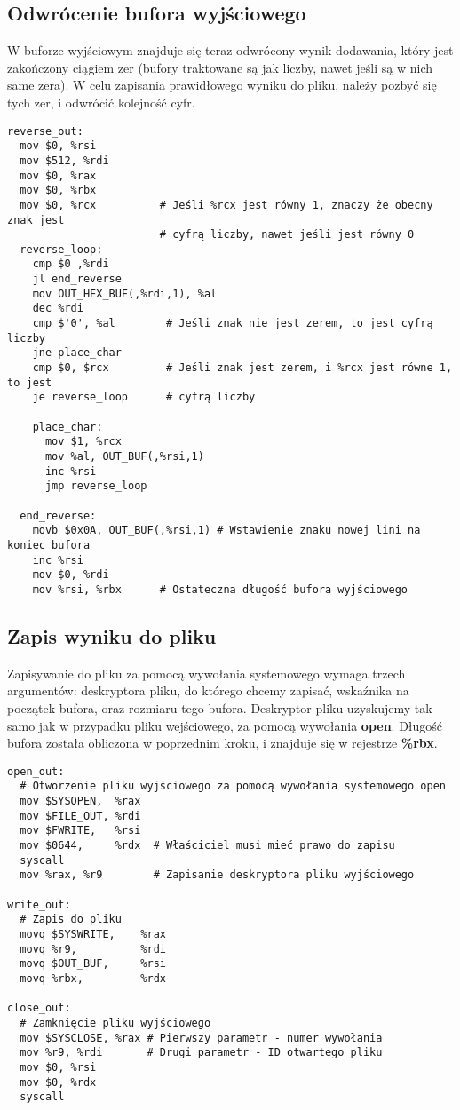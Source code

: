 \documentclass[11pt]{report}
\begin{document}
\subsection{Odwrócenie bufora wyjściowego}
W buforze wyjściowym znajduje się teraz odwrócony wynik dodawania, który jest zakończony ciągiem zer (bufory traktowane są jak liczby, nawet jeśli są w nich same zera). W celu zapisania prawidłowego wyniku do pliku, należy pozbyć się tych zer, i odwrócić kolejność cyfr.
\begin{verbatim}
reverse_out:
  mov $0, %rsi             
  mov $512, %rdi
  mov $0, %rax
  mov $0, %rbx
  mov $0, %rcx          # Jeśli %rcx jest równy 1, znaczy że obecny znak jest
                        # cyfrą liczby, nawet jeśli jest równy 0
  reverse_loop:
    cmp $0 ,%rdi
    jl end_reverse
    mov OUT_HEX_BUF(,%rdi,1), %al
    dec %rdi
    cmp $'0', %al        # Jeśli znak nie jest zerem, to jest cyfrą liczby
    jne place_char
    cmp $0, $rcx         # Jeśli znak jest zerem, i %rcx jest równe 1, to jest
    je reverse_loop      # cyfrą liczby
    
    place_char:
      mov $1, %rcx
      mov %al, OUT_BUF(,%rsi,1)
      inc %rsi
      jmp reverse_loop
      
  end_reverse:
    movb $0x0A, OUT_BUF(,%rsi,1) # Wstawienie znaku nowej lini na koniec bufora
    inc %rsi
    mov $0, %rdi
    mov %rsi, %rbx      # Ostateczna długość bufora wyjściowego

\end{verbatim}
\newpage
\subsection{Zapis wyniku do pliku}
Zapisywanie do pliku za pomocą wywołania systemowego wymaga trzech argumentów: deskryptora pliku, do którego chcemy zapisać, wskaźnika na początek bufora, oraz rozmiaru tego bufora.
Deskryptor pliku uzyskujemy tak samo jak w przypadku pliku wejściowego, za pomocą wywołania \textbf{open}. Długość bufora została obliczona w poprzednim kroku, i znajduje się w rejestrze \textbf{\%rbx}.
\begin{verbatim}
open_out:
  # Otworzenie pliku wyjściowego za pomocą wywołania systemowego open
  mov $SYSOPEN,  %rax
  mov $FILE_OUT, %rdi 
  mov $FWRITE,   %rsi 
  mov $0644,     %rdx  # Właściciel musi mieć prawo do zapisu
  syscall
  mov %rax, %r9        # Zapisanie deskryptora pliku wyjściowego
  
write_out:
  # Zapis do pliku
  movq $SYSWRITE,    %rax
  movq %r9,          %rdi
  movq $OUT_BUF,     %rsi
  movq %rbx,         %rdx
  
close_out:
  # Zamknięcie pliku wyjściowego
  mov $SYSCLOSE, %rax # Pierwszy parametr - numer wywołania
  mov %r9, %rdi       # Drugi parametr - ID otwartego pliku
  mov $0, %rsi
  mov $0, %rdx
  syscall
\end{verbatim}
\end{document}
